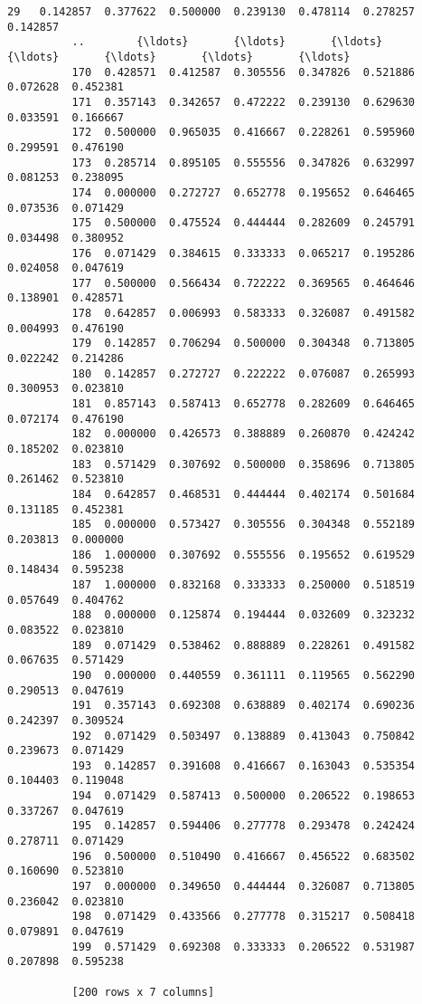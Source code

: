 \documentclass[11pt]{article}
\begin{document}
\begin{Verbatim}[commandchars=\\\{\}]
          29   0.142857  0.377622  0.500000  0.239130  0.478114  0.278257  0.142857
          ..        {\ldots}       {\ldots}       {\ldots}       {\ldots}       {\ldots}       {\ldots}       {\ldots}
          170  0.428571  0.412587  0.305556  0.347826  0.521886  0.072628  0.452381
          171  0.357143  0.342657  0.472222  0.239130  0.629630  0.033591  0.166667
          172  0.500000  0.965035  0.416667  0.228261  0.595960  0.299591  0.476190
          173  0.285714  0.895105  0.555556  0.347826  0.632997  0.081253  0.238095
          174  0.000000  0.272727  0.652778  0.195652  0.646465  0.073536  0.071429
          175  0.500000  0.475524  0.444444  0.282609  0.245791  0.034498  0.380952
          176  0.071429  0.384615  0.333333  0.065217  0.195286  0.024058  0.047619
          177  0.500000  0.566434  0.722222  0.369565  0.464646  0.138901  0.428571
          178  0.642857  0.006993  0.583333  0.326087  0.491582  0.004993  0.476190
          179  0.142857  0.706294  0.500000  0.304348  0.713805  0.022242  0.214286
          180  0.142857  0.272727  0.222222  0.076087  0.265993  0.300953  0.023810
          181  0.857143  0.587413  0.652778  0.282609  0.646465  0.072174  0.476190
          182  0.000000  0.426573  0.388889  0.260870  0.424242  0.185202  0.023810
          183  0.571429  0.307692  0.500000  0.358696  0.713805  0.261462  0.523810
          184  0.642857  0.468531  0.444444  0.402174  0.501684  0.131185  0.452381
          185  0.000000  0.573427  0.305556  0.304348  0.552189  0.203813  0.000000
          186  1.000000  0.307692  0.555556  0.195652  0.619529  0.148434  0.595238
          187  1.000000  0.832168  0.333333  0.250000  0.518519  0.057649  0.404762
          188  0.000000  0.125874  0.194444  0.032609  0.323232  0.083522  0.023810
          189  0.071429  0.538462  0.888889  0.228261  0.491582  0.067635  0.571429
          190  0.000000  0.440559  0.361111  0.119565  0.562290  0.290513  0.047619
          191  0.357143  0.692308  0.638889  0.402174  0.690236  0.242397  0.309524
          192  0.071429  0.503497  0.138889  0.413043  0.750842  0.239673  0.071429
          193  0.142857  0.391608  0.416667  0.163043  0.535354  0.104403  0.119048
          194  0.071429  0.587413  0.500000  0.206522  0.198653  0.337267  0.047619
          195  0.142857  0.594406  0.277778  0.293478  0.242424  0.278711  0.071429
          196  0.500000  0.510490  0.416667  0.456522  0.683502  0.160690  0.523810
          197  0.000000  0.349650  0.444444  0.326087  0.713805  0.236042  0.023810
          198  0.071429  0.433566  0.277778  0.315217  0.508418  0.079891  0.047619
          199  0.571429  0.692308  0.333333  0.206522  0.531987  0.207898  0.595238
          
          [200 rows x 7 columns]
\end{Verbatim}
            
\end{document}
